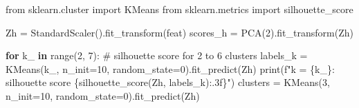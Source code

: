 \documentclass[
  letterpaper,
  DIV=11,
  numbers=noendperiod]{scrreprt}
\newenvironment{Shaded}{\begin{snugshade}}{\end{snugshade}}
\newcommand{\BuiltInTok}[1]{\textcolor[rgb]{0.00,0.23,0.31}{#1}}
\newcommand{\CommentTok}[1]{\textcolor[rgb]{0.37,0.37,0.37}{#1}}
\newcommand{\ControlFlowTok}[1]{\textcolor[rgb]{0.00,0.23,0.31}{\textbf{#1}}}
\newcommand{\DecValTok}[1]{\textcolor[rgb]{0.68,0.00,0.00}{#1}}
\newcommand{\ImportTok}[1]{\textcolor[rgb]{0.00,0.46,0.62}{#1}}
\newcommand{\KeywordTok}[1]{\textcolor[rgb]{0.00,0.23,0.31}{\textbf{#1}}}
\newcommand{\NormalTok}[1]{\textcolor[rgb]{0.00,0.23,0.31}{#1}}
\newcommand{\OperatorTok}[1]{\textcolor[rgb]{0.37,0.37,0.37}{#1}}
\newcommand{\SpecialCharTok}[1]{\textcolor[rgb]{0.37,0.37,0.37}{#1}}
\newcommand{\SpecialStringTok}[1]{\textcolor[rgb]{0.13,0.47,0.30}{#1}}
\begin{document}
\begin{Shaded}
\begin{Highlighting}[]
\ImportTok{from}\NormalTok{ sklearn.cluster }\ImportTok{import}\NormalTok{ KMeans}
\ImportTok{from}\NormalTok{ sklearn.metrics }\ImportTok{import}\NormalTok{ silhouette\_score}

\NormalTok{Zh }\OperatorTok{=}\NormalTok{ StandardScaler().fit\_transform(feat)}
\NormalTok{scores\_h }\OperatorTok{=}\NormalTok{ PCA(}\DecValTok{2}\NormalTok{).fit\_transform(Zh)}

\ControlFlowTok{for}\NormalTok{ k\_ }\KeywordTok{in} \BuiltInTok{range}\NormalTok{(}\DecValTok{2}\NormalTok{, }\DecValTok{7}\NormalTok{):                           }\CommentTok{\# silhouette score for 2 to 6 clusters}
\NormalTok{    labels\_k }\OperatorTok{=}\NormalTok{ KMeans(k\_, n\_init}\OperatorTok{=}\DecValTok{10}\NormalTok{, random\_state}\OperatorTok{=}\DecValTok{0}\NormalTok{).fit\_predict(Zh)}
    \BuiltInTok{print}\NormalTok{(}\SpecialStringTok{f"k = }\SpecialCharTok{\{}\NormalTok{k\_}\SpecialCharTok{\}}\SpecialStringTok{: silhouette score }\SpecialCharTok{\{}\NormalTok{silhouette\_score(Zh, labels\_k)}\SpecialCharTok{:.3f\}}\SpecialStringTok{"}\NormalTok{)}
\NormalTok{clusters }\OperatorTok{=}\NormalTok{ KMeans(}\DecValTok{3}\NormalTok{, n\_init}\OperatorTok{=}\DecValTok{10}\NormalTok{, random\_state}\OperatorTok{=}\DecValTok{0}\NormalTok{).fit\_predict(Zh)}


\end{Highlighting}
\end{Shaded}
\end{document}
